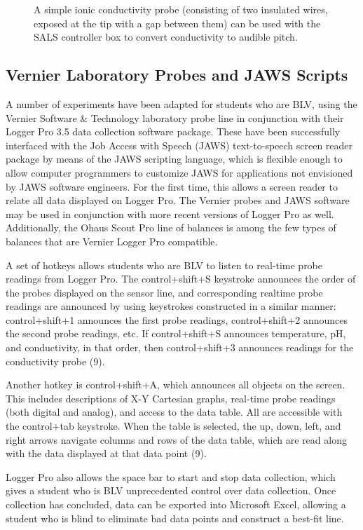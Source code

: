 \documentclass[11.5pt]{sig-alternate} %
\begin{document}
\begin{large}
\begin{figure}[!h]
    \caption{A simple ionic conductivity probe (consisting of two insulated wires, exposed at the tip with a gap between them) can be used with the SALS controller box to convert conductivity to audible pitch.}
\end{figure}

\subsection*{Vernier Laboratory Probes and JAWS Scripts}

A number of experiments have been adapted for students who are BLV, using the Vernier Software \& Technology laboratory probe line in conjunction with their Logger Pro 3.5 data collection software package. These have been successfully interfaced with the Job Access with Speech (JAWS) text-to-speech screen reader package by means of the JAWS scripting language, which is flexible enough to allow computer programmers to customize JAWS for applications not envisioned by JAWS software engineers. For the first time, this allows a screen reader to relate all data displayed on Logger Pro. The Vernier probes and JAWS software may be used in conjunction with more recent versions of Logger Pro as well. Additionally, the Ohaus Scout Pro line of balances is among the few types of balances that are Vernier Logger Pro compatible. 

A set of hotkeys allows students who are BLV to listen to real-time probe readings from Logger Pro. The control+shift+S keystroke announces the order of the probes displayed on the sensor line, and corresponding realtime probe readings are announced by using keystrokes constructed in a similar manner: control+shift+1 announces the first probe readings, control+shift+2 announces the second probe readings, etc. If control+shift+S announces temperature, pH, and conductivity, in that order, then control+shift+3 announces readings for the conductivity probe (9). 

Another hotkey is control+shift+A, which announces all objects on the screen. This includes descriptions of X-Y Cartesian graphs, real-time probe readings (both digital and analog), and access to the data table. All are accessible with the control+tab keystroke. When the table is selected, the up, down, left, and right arrows navigate columns and rows of the data table, which are read along with the data displayed at that data point (9). 

Logger Pro also allows the space bar to start and stop data collection, which gives a student who is BLV unprecedented control over data collection. Once collection has concluded, data can be exported into Microsoft Excel, allowing a student who is blind to eliminate bad data points and construct a best-fit line.


\end{large}
\end{document}
